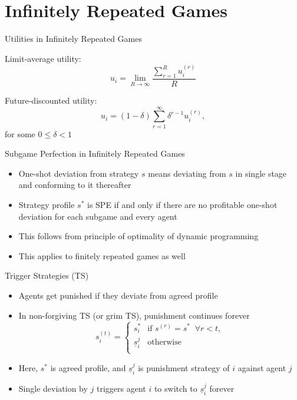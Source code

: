 \documentclass[11pt,aspectratio=169]{beamer}
\begin{document}
 \section{Infinitely Repeated Games}
 
  \begin{frame}{Utilities in Infinitely Repeated Games}
   \begin{itemizes}[2em]
    \item \alert{Limit-average utility}: 
    $$u_i = \lim_{R\rightarrow\infty}\frac{\sum_{r=1}^{R}u_i^{(r)}}{R}$$
    \item \alert{Future-discounted utility}: 
    $$u_i = (1 - \delta) \sum_{r=1}^{\infty}\delta^{r-1} u_i^{(r)},$$
    for some $0 \le \delta < 1$
   \end{itemizes}
  \end{frame}
  
  
  \begin{frame}{Subgame Perfection in Infinitely Repeated Games}
   \begin{itemize}
   \setlength{\itemsep}{2em}
    \item \alert{One-shot deviation} from strategy $s$ means deviating from $s$ in single stage and conforming to it thereafter
    \item Strategy profile $s^*$ is SPE \alert{if and only if} there are no \alert{profitable} one-shot deviation for \alert{each subgame} and \alert{every agent}
    \item This follows from principle of optimality of \alert{dynamic programming}
    \item This applies to finitely repeated games as well
   \end{itemize}
  \end{frame}

  \begin{frame}{Trigger Strategies (TS)}
   \begin{itemize}
    \item Agents get \alert{punished} if they deviate from agreed profile
    \item In \alert{non-forgiving} TS (or grim TS), punishment continues forever
    $$ 
    s_i^{(t)}=\begin{cases}
                  s_i^* &\text{if } s^{(r)} = s^* \;\; \forall r<t,\\
                  \underline{s}_{i}^{j} &\text{otherwise}\\
                 \end{cases}
    $$
    \item Here, $s^{*}$ is agreed profile, and $\underline{s}_{i}^{j}$ is punishment strategy of $i$ against agent $j$
    \item Single deviation by $j$ triggers agent $i$ to switch to $\underline{s}_{i}^{j}$ \alert{forever}
   \end{itemize}
  \end{frame}
\end{document}
